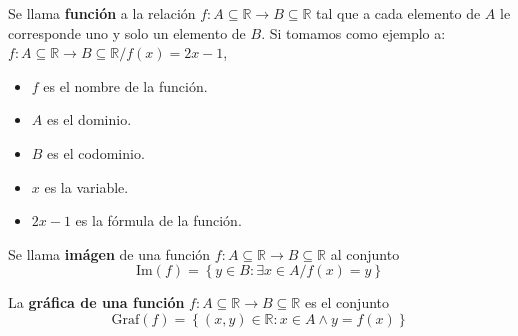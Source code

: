 \begin{definition}
    Se llama \textbf{función} a la relación $f: A \subseteq \mathbb{R} \rightarrow B \subseteq \mathbb{R}$ tal que a cada elemento de
    $A$ le corresponde uno y solo un elemento de $B$.
    Si tomamos como ejemplo a: $f: A \subseteq \mathbb{R} \rightarrow B \subseteq \mathbb{R} / f(x)=2x-1$,
    \begin{itemize}
        \item $f$ es el nombre de la función.
        \item $A$ es el dominio.
        \item $B$ es el codominio.
        \item $x$ es la variable.
        \item $2x-1$ es la fórmula de la función.
    \end{itemize}
\end{definition}
\begin{definition}
    Se llama \textbf{imágen} de una función $f: A \subseteq \mathbb{R} \rightarrow B \subseteq \mathbb{R}$ 
    al conjunto 
    \begin{equation*}
        \text{Im}(f) = \left\{ y\in B: \exists x\in A / f(x)=y \right\}    
    \end{equation*}
\end{definition}
\begin{definition}
    La \textbf{gráfica de una función} $f: A \subseteq \mathbb{R} \rightarrow B \subseteq \mathbb{R}$ es
    el conjunto
    \begin{equation*}
        \text{Graf}(f) = \left\{ (x,y)\in \mathbb{R}: x \in A \land y=f(x)\right\}    
    \end{equation*}
\end{definition}
